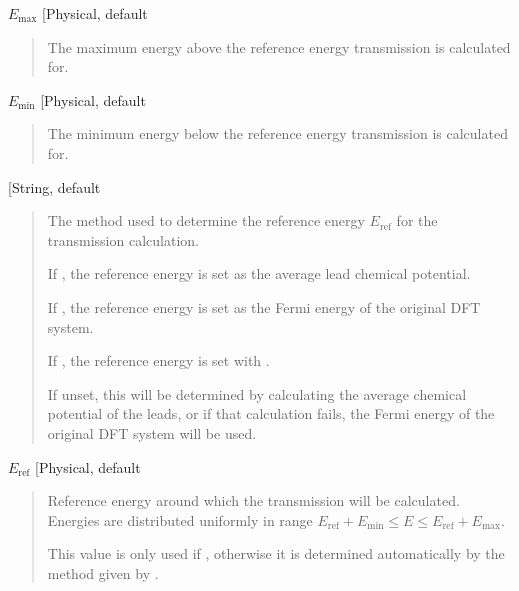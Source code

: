 \documentclass[letterpaper,10pt,english]{sphinxmanual}
\begin{document}
 \(E_{\mathrm{max}}\) {[}Physical, default \sphinxcode{etrans\_emax: -0.2 Hartree}{]}
\begin{quote}

\begin{DUlineblock}{0em}
\item[] The maximum energy above the reference energy transmission is
calculated for.
\end{DUlineblock}
\end{quote}

 \(E_{\mathrm{min}}\) {[}Physical, default \sphinxcode{etrans\_emin: 0.2 Hartree}{]}
\begin{quote}

\begin{DUlineblock}{0em}
\item[] The minimum energy below the reference energy transmission is
calculated for.
\end{DUlineblock}
\end{quote}

 {[}String, default \sphinxcode{etrans\_eref\_method: LEADS}{]}
\begin{quote}

\begin{DUlineblock}{0em}
\item[] The method used to determine the reference energy
\(E_{\mathrm{ref}}\) for the transmission calculation.
\item[] If , the reference energy is set as the average lead chemical potential.
\item[] If , the reference energy is set as the Fermi energy of the original DFT system.
\item[] If , the reference energy is set with .
\item[] If unset, this will be determined by calculating the average chemical
potential of the leads, or if that calculation fails, the Fermi energy
of the original DFT system will be used.
\end{DUlineblock}
\end{quote}

 \(E_{\mathrm{ref}}\) {[}Physical, default \sphinxcode{etrans\_eref: Determined automatically}{]}
\begin{quote}

\begin{DUlineblock}{0em}
\item[] Reference energy around which the transmission will be calculated. Energies are distributed uniformly in range \(E_{\mathrm{ref}}+E_{\mathrm{min}} \leq E \leq E_{\mathrm{ref}}+E_{\mathrm{max}}\).
\item[] This value is only used if , otherwise it is determined automatically by the method given by .
\end{DUlineblock}
\end{quote}
\end{document}
